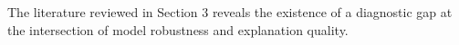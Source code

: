 
The literature reviewed in Section 3 reveals the existence of a diagnostic gap at the intersection
of model robustness and explanation quality.


